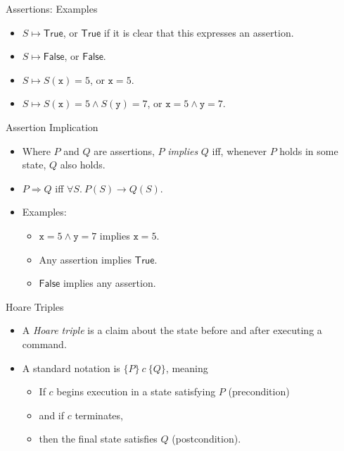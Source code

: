 \documentclass{beamer}
\begin{document}
\begin{frame}{Assertions: Examples}
  \begin{itemize}
    \item $S \mapsto \mathsf{True}$, or $\mathsf{True}$ if it is clear that this expresses an assertion.
    \item $S \mapsto \mathsf{False}$, or $\mathsf{False}$.
    \item $S \mapsto S(\texttt{x})=5$, or $\texttt{x}=5$.
    \item $S \mapsto S(\texttt{x})=5 \land S(\texttt{y})=7$, or
      $\texttt{x}=5 \land \texttt{y}=7$.
  \end{itemize}
\end{frame}

\begin{frame}{Assertion Implication}
  \begin{itemize}
    \item Where $P$ and $Q$ are assertions, $P$ \emph{implies} $Q$ iff, whenever
      $P$ holds in some state, $Q$ also holds.
    \item $P \Rightarrow Q$ iff $\forall S.\ P(S) \to Q(S)$.
    \item Examples:
      \begin{itemize}
        \item $\texttt{x}=5 \land \texttt{y}=7$ implies $\texttt{x}=5$.
        \item Any assertion implies $\mathsf{True}$.
        \item $\mathsf{False}$ implies any assertion.
      \end{itemize}
  \end{itemize}
\end{frame}

\begin{frame}{Hoare Triples}
  \begin{itemize}
    \item A \emph{Hoare triple} is a claim about the state before and after executing a command.
    \item A standard notation is $\{P\}\ c\ \{Q\}$, meaning
      \begin{itemize}
        \item If $c$ begins execution in a state satisfying $P$ (precondition)
        \item and if $c$ terminates,
        \item then the final state satisfies $Q$ (postcondition).
      \end{itemize}
  \end{itemize}
\end{frame}
\end{document}
